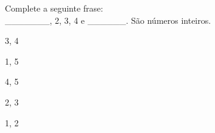 \question[10]
Complete a seguinte frase:\\
_______, 2, 3, 4 e ______. São números inteiros.
\\
\begin{choices}
\item 3, 4 
\item 1, 5 %
\item 4, 5 
\item 2, 3
\item 1, 2 
\end{choices}
\answerline

